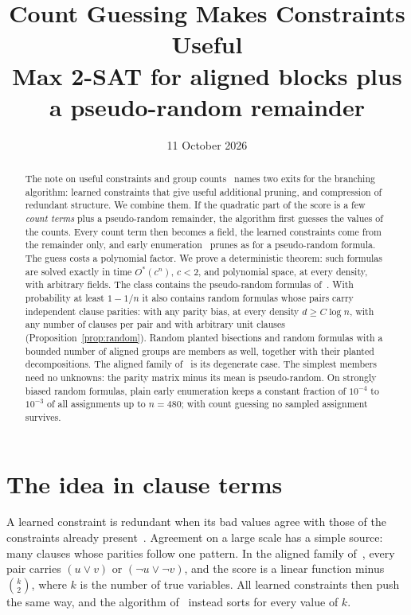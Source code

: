 \documentclass[11pt,a4paper]{article}
\title{Count Guessing Makes Constraints Useful\\
\large Max 2-SAT for aligned blocks plus a pseudo-random remainder}
\author{}
\date{11 October 2026}
\theoremstyle{definition}
\theoremstyle{remark}
\newcommand{\Ostar}{O^{*}}
\begin{document}
\maketitle

\begin{abstract}
The note on useful constraints and group counts~\cite{RG} names two exits for
the branching algorithm: learned constraints that give useful additional
pruning, and compression of redundant structure. We combine them. If the
quadratic part of the score is a few \emph{count terms} plus a pseudo-random
remainder, the algorithm first guesses the values of the counts. Every count
term then becomes a field, the learned constraints come from the remainder
only, and early enumeration~\cite{EE,CC} prunes as for a pseudo-random
formula. The guess costs a polynomial factor. We prove a deterministic
theorem: such formulas are solved exactly in time $\Ostar(c^n)$, $c<2$, and
polynomial space, at every density, with arbitrary fields. The class contains
the pseudo-random formulas of~\cite{CC}. With probability at least $1-1/n$ it
also contains random formulas whose pairs carry independent clause parities:
with any parity bias, at every density $d\ge C\log n$, with any number of
clauses per pair and with arbitrary unit clauses
(Proposition~\ref{prop:random}). Random planted bisections and random formulas
with a bounded number of aligned groups are members as well, together with
their planted decompositions. The aligned family
of~\cite[Section~4]{RG} is its degenerate case. The simplest members need no
unknowns: the parity matrix minus its mean is pseudo-random. On strongly biased random formulas, plain early enumeration
keeps a constant fraction of $10^{-4}$ to $10^{-3}$ of all assignments
up to $n=480$; with count guessing no sampled assignment survives.
\end{abstract}

\section{The idea in clause terms}\label{sec:idea}

A learned constraint is redundant when its bad values agree with those of the
constraints already present~\cite{RG}. Agreement on a large scale has a simple
source: many clauses whose parities follow one pattern. In the aligned family
of~\cite[Section~4]{RG}, every pair carries $(u\lor v)$ or
$(\neg u\lor\neg v)$, and the score is a linear function minus
$\binom k2$, where $k$ is the number of true variables. All learned constraints
then push the same way, and the algorithm of~\cite{RG} instead sorts for every
value of $k$.
\end{document}
